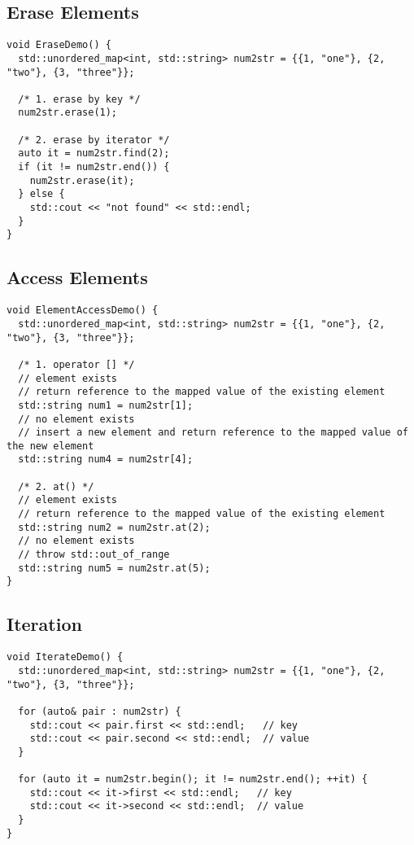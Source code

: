 \subsection{Erase Elements}
\begin{lstlisting}
void EraseDemo() {
  std::unordered_map<int, std::string> num2str = {{1, "one"}, {2, "two"}, {3, "three"}};

  /* 1. erase by key */
  num2str.erase(1);

  /* 2. erase by iterator */
  auto it = num2str.find(2);
  if (it != num2str.end()) {
    num2str.erase(it);
  } else {
    std::cout << "not found" << std::endl;
  }
}
\end{lstlisting}

\subsection{Access Elements}
\begin{lstlisting}
void ElementAccessDemo() {
  std::unordered_map<int, std::string> num2str = {{1, "one"}, {2, "two"}, {3, "three"}};

  /* 1. operator [] */
  // element exists
  // return reference to the mapped value of the existing element
  std::string num1 = num2str[1];
  // no element exists
  // insert a new element and return reference to the mapped value of the new element
  std::string num4 = num2str[4];

  /* 2. at() */
  // element exists
  // return reference to the mapped value of the existing element
  std::string num2 = num2str.at(2);
  // no element exists
  // throw std::out_of_range
  std::string num5 = num2str.at(5);
}
\end{lstlisting}

\subsection{Iteration}
\begin{lstlisting}
void IterateDemo() {
  std::unordered_map<int, std::string> num2str = {{1, "one"}, {2, "two"}, {3, "three"}};

  for (auto& pair : num2str) {
    std::cout << pair.first << std::endl;   // key
    std::cout << pair.second << std::endl;  // value
  }

  for (auto it = num2str.begin(); it != num2str.end(); ++it) {
    std::cout << it->first << std::endl;   // key
    std::cout << it->second << std::endl;  // value
  }
}
\end{lstlisting}

